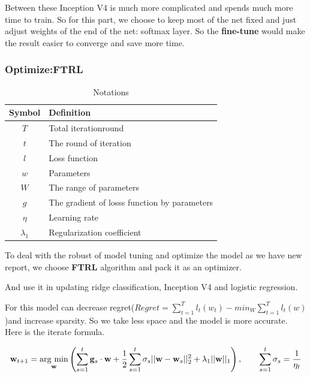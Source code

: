 \documentclass[12pt]{article}
\begin{document}
Between these Inception V4 is much more complicated and spends much more time to train.  So for this part, we choose to keep most of the net fixed and just adjust weights of the end of the net: softmax layer. So the \textbf{fine-tune} would make the result easier to converge and save more time.

\subsubsection{Optimize:FTRL}
\begin{table}[H]
	\begin{center}
		\caption{Notations}
		\begin{tabular}{cl}
			\toprule
			\multicolumn{1}{m{3cm}}{\centering Symbol}
			&\multicolumn{1}{m{8cm}}{\centering Definition}\\
			\midrule
			$T$& Total iterationround\\
			$t$& The round of iteration \\
			$l$&Loss function\\
			$w$&Parameters\\
			$W$&The range of parameters\\
			$g$& The gradient of losss function by parameters\\
			$\eta$&Learning rate\\
			$\lambda_1$&Regularization coefficient\\
			\bottomrule
		\end{tabular}\label{Ntt}
	\end{center}
\end{table}
To deal with the robust of model tuning and optimize the model as we have new report, we choose \textbf{FTRL}  algorithm and pack it as an optimizer.

And use it in updating ridge classification, Inception V4 and logistic regression.

For this model can decrease regret($Regret=\sum_{t=1}^T l_t(w_t)-min_{W}\sum_{t=1}^Tl_t(w)$)and increase sparsity. So  we take less space and the model is more accurate. Here is the iterate formula.



\begin{equation}\mathbf{w}_{t+1} = \underset{\rm \mathbf{w}}{\rm arg\ min}\left(\displaystyle\sum_{s=1}^t {\mathbf{g}_s \cdot \mathbf{w}} + \frac 12 \displaystyle\sum_{s=1}^t {\sigma_s||\mathbf{w} - \mathbf{w}_s||_2^2} + \lambda_1||\mathbf{w}||_1\right),\qquad \sum_{s=1}^t \sigma_s = \frac 1{\eta_t}\end{equation}
\end{document}
